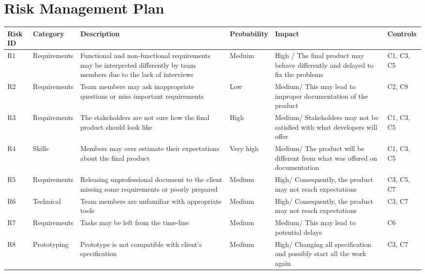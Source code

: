 \documentclass{l3deliverable}
\begin{document}
{%

\section{Risk Management Plan}

\begin{center}{
\begin{tabular}{|p{2cm}|p{2cm}|p{3cm}|p{2cm}|p{3cm}|p{2cm}|}
\hline \textbf{Risk ID} &\textbf{Category} & \textbf{Description} & \textbf{Probability} & \textbf{Impact} & \textbf{Controls}\\
\hline R1 & Requirements & Functional and non-functional requirements may be interpreted differently by team members due to the lack of interviews & Meduim & High / The final product may behave differently and delayed to fix the problems & C1, C3, C5\\
\hline R2 & Requirements & Team members may ask inappropriate questions or miss important requirements & Low & Medium/ This may lead to improper documentation of the product & C2, C8\\
\hline R3 & Requirements & The stakeholders are not sure how the final product should look like & High & Medium/ Stakeholders may not be satisfied with what developers will offer & C1, C3, C5\\
\hline R4 & Skills & Members may over estimate their expectations about the final product & Very high & Medium/ The product will be different from what was offered on documentation & C1, C3, C5\\
\hline R5 & Requirements & Releasing unprofessional document to the client missing some requirements or poorly prepared & Medium & High/ Consequently, the product may not reach expectations & C3, C5, C7\\
\hline R6 & Technical & Team members are unfamiliar with appropriate tools & Medium & High/ Consequently, the product may not reach expectations & C3, C7\\
\hline R7 & Requirements & Tasks may be left from the time-line & Medium & Medium/ This may lead to potential delays & C6\\
\hline R8 & Prototyping & Prototype is not compatible with client's specification & Medium & High/ Changing all specification and possibly start all the work again & C3, C7\\
\hline
\end{tabular} }
\end{center}

}
\end{document}
